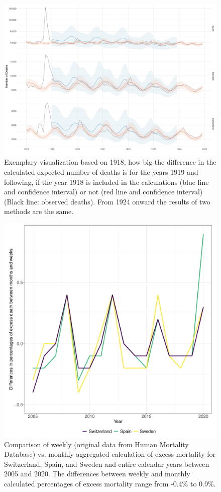 \documentclass{article}
\begin{document}
	
	\begin{figure}[H]
		\centering	
		\includegraphics[width=\linewidth]{../Figure_S3.png}
		\caption{Exemplary visualization based on 1918, how big the difference in the calculated expected number of deaths is for the years 1919 and following, if the year 1918 is included in the calculations (blue line and confidence interval) or not (red line and confidence interval) (Black line: observed deaths). From 1924 onward the results of two methods are the same. }
	\end{figure}

	\begin{figure}[H]
	\centering	
	\includegraphics[width=.7\linewidth]{../plot_appendix_week_month}
	\caption{Comparison of weekly (original data from Human Mortality Database) vs. monthly aggregated calculation of excess mortality for Switzerland, Spain, and Sweden and entire calendar years between 2005 and 2020. The differences between weekly and monthly calculated percentages of excess mortality range from -0.4\% to 0.9\%. }
\end{figure}


	
	\clearpage
	
	
	
	
	
\end{document}
